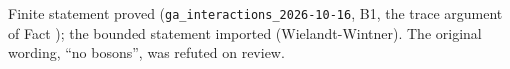 Finite statement proved (\texttt{ga\_interactions\_2026-10-16}, B1, the trace argument of Fact ); the bounded statement imported (Wielandt-Wintner). The original wording, ``no bosons'', was refuted on review.
